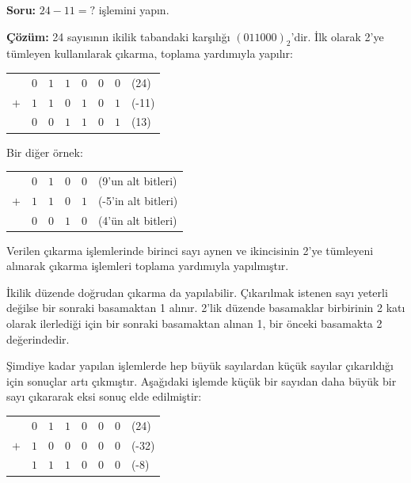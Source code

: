 \begin{ornek}[5.2]
\textbf{Soru:} $24 - 11 = ?$ işlemini yapın.

\textbf{Çözüm:} 24 sayısının ikilik tabandaki karşılığı $(011000)_2$'dir. İlk olarak 2'ye tümleyen kullanılarak çıkarma, toplama yardımıyla yapılır:

\begin{center}
\begin{tabular}{r c c c c c c l}
  & $0$ & $1$ & $1$ & $0$ & $0$ & $0$ & (24) \\
$+$ & $1$ & $1$ & $0$ & $1$ & $0$ & $1$ & (-11) \\
\hline
  & $0$ & $0$ & $1$ & $1$ & $0$ & $1$ & (13) \\
\end{tabular}
\end{center}

Bir diğer örnek:
\begin{center}
\begin{tabular}{r c c c c l}
  & $0$ & $1$ & $0$ & $0$ & (9'un alt bitleri) \\
$+$ & $1$ & $1$ & $0$ & $1$ & (-5'in alt bitleri) \\
\hline
  & $0$ & $0$ & $1$ & $0$ & (4'ün alt bitleri) \\
\end{tabular}
\end{center}

Verilen çıkarma işlemlerinde birinci sayı aynen ve ikincisinin 2'ye tümleyeni alınarak çıkarma işlemleri toplama yardımıyla yapılmıştır.

İkilik düzende doğrudan çıkarma da yapılabilir. Çıkarılmak istenen sayı yeterli değilse bir sonraki basamaktan 1 alınır. 2'lik düzende basamaklar birbirinin 2 katı olarak ilerlediği için bir sonraki basamaktan alınan 1, bir önceki basamakta 2 değerindedir.
\end{ornek}

Şimdiye kadar yapılan işlemlerde hep büyük sayılardan küçük sayılar çıkarıldığı için sonuçlar artı çıkmıştır. Aşağıdaki işlemde küçük bir sayıdan daha büyük bir sayı çıkararak eksi sonuç elde edilmiştir:

\begin{center}
\begin{tabular}{r c c c c c c l}
  & $0$ & $1$ & $1$ & $0$ & $0$ & $0$ & (24)  \\
$+$ & $1$ & $0$ & $0$ & $0$ & $0$ & $0$ & (-32) \\
\hline
  & $1$ & $1$ & $1$ & $0$ & $0$ & $0$ & (-8) \\
\end{tabular}
\end{center}

